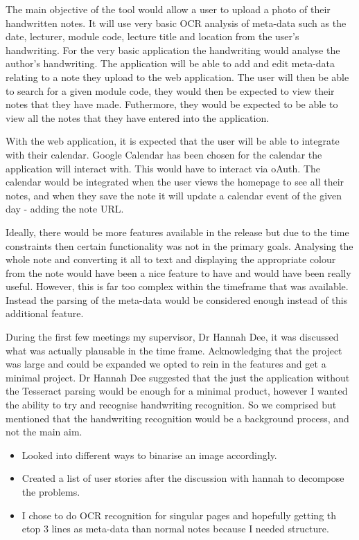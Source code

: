 The main objective of the tool would allow a user to upload a photo of their handwritten notes. It will use very basic OCR analysis of meta-data such as the date, lecturer, module code, lecture title and location from the user's handwriting. For the very basic application the handwriting would analyse the author's handwriting. The application will be able to add and edit meta-data relating to a note they upload to the web application. The user will then be able to search for a given module code, they would then be expected to view their notes that they have made. Futhermore, they would be expected to be able to view all the notes that they have entered into the application.

With the web application, it is expected that the user will be able to integrate with their calendar. Google Calendar has been chosen for the calendar the application will interact with. This would have to interact via oAuth. The calendar would be integrated when the user views the homepage to see all their notes, and when they save the note it will update a calendar event of the given day - adding the note URL.

Ideally, there would be more features available in the release but due to the time constraints then certain functionality was not in the primary goals. Analysing the whole note and converting it all to text and displaying the appropriate colour from the note would have been a nice feature to have and would have been really useful. However, this is far too complex within the timeframe that was available. Instead the parsing of the meta-data would be considered enough instead of this additional feature.

During the first few meetings my supervisor, Dr Hannah Dee, it was discussed what was actually plausable in the time frame. Acknowledging that the project was large and could be expanded we opted to rein in the features and get a minimal project. Dr Hannah Dee suggested that the just the application without the Tesseract parsing would be enough for a minimal product, however I wanted the ability to try and recognise handwriting recognition. So we comprised but mentioned that the handwriting recognition would be a background process, and not the main aim.


\begin{itemize}
  \item Looked into different ways to binarise an image accordingly.
  \item Created a list of user stories after the discussion with hannah to decompose the problems.
  \item I chose to do OCR recognition for singular pages and hopefully getting th etop 3 lines as meta-data than normal notes because I needed structure.
\end{itemize}

